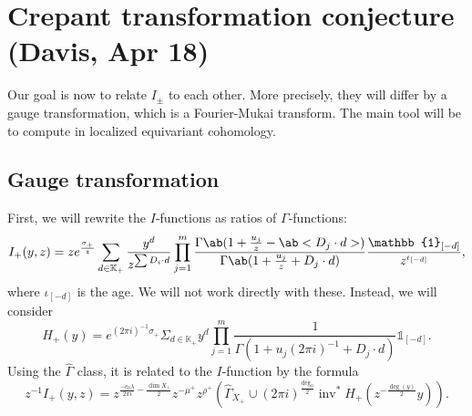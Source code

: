 \documentclass[leqno, openany]{memoir}
\theoremstyle{definition}
\theoremstyle{remark}
\theoremstyle{plain}
\theoremstyle{definition}
\theoremstyle{remark}
\newcommand{\K}{\mathbb{K}}
\newcommand{\on}[1]{\operatorname{#1}}
\newcommand{\wh}[1]{\widehat{#1}}
\begin{document}
\section{Crepant transformation conjecture (Davis, Apr 18)}%
\label{sec:Crepant transformation conjecture}

Our goal is now to relate $I_{\pm}$ to each other. More precisely, they will differ by a gauge transformation, which is a Fourier-Mukai transform. The main tool will be to compute in localized equivariant cohomology. 

\subsection{Gauge transformation}%
\label{sub:Gauge transformation}

First, we will rewrite the $I$-functions as ratios of $\Gamma$-functions:
\[ I_+(y,z) = ze^{\frac{\sigma_+}{z}} \sum_{d \in \K_+} \frac{y^d}{z^{\sum D_i \cdot d}} \prod_{j=1}^m \frac{\Gamma\ab(1 + \frac{u_j}{z} - \ab<D_j \cdot d>)}{\Gamma\ab(1 + \frac{u_j}{z} + D_j \cdot d)} \frac{\mathbb{1}_{[-d]}}{z^{\iota_{[-d]}}}, \]
where $\iota_{[-d]}$ is the age. We will not work directly with these. Instead, we will consider
\[ H_+(y) = e^{(2\pi i)^{-1} \sigma_+} \Sigma_{d \in \K_+} y^d \prod_{j=1}^m \frac{1}{\Gamma(1 + u_j (2\pi i)^{-1} + D_j \cdot d)} \mathbb{1}_{[-d]}. \]
Using the $\wh{\Gamma}$ class, it is related to the $I$-function by the formula
\[z^{-1} I_+(y,z) = z^{\frac{-c_0 \lambda}{2\pi i} - \frac{\dim X_+}{2}} z^{-\mu^+} z^{\rho^+} (\wh{\Gamma}_{X_+} \cup (2\pi i)^{\frac{\deg_0}{2}} \on{inv}^* H_+(z^{-\frac{\deg(y)}{2}} y)). \]
\end{document}
